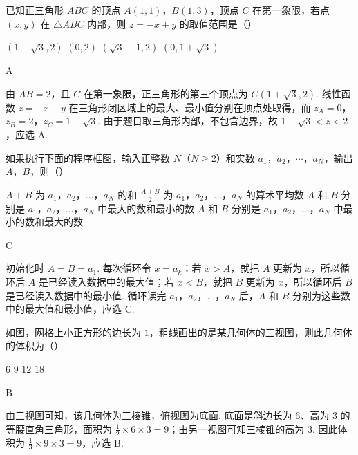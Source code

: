 \begin{problem}
已知正三角形 \(ABC\) 的顶点 \(A(1,1)\)，\(B(1,3)\)，顶点 \(C\) 在第一象限，若点 \((x,y)\) 在 \(\triangle ABC\) 内部，则 \(z = -x + y\) 的取值范围是（\quad）

\choices
    {\( (1-\sqrt{3},2) \)}
    {\((0,2)\)}
    {\((\sqrt{3} - 1, 2)\)}
    {\((0, 1 + \sqrt{3})\)}

\begin{answer}
A
\end{answer}

\begin{solution}
由 \(AB=2\)，且 \(C\) 在第一象限，正三角形的第三个顶点为 \(C(1+\sqrt3,2)\). 线性函数 \(z=-x+y\) 在三角形闭区域上的最大、最小值分别在顶点处取得，而
\(z_A=0\)，\(z_B=2\)，\(z_C=1-\sqrt3\). 由于题目取三角形内部，不包含边界，故 \(1-\sqrt3<z<2\)，应选 A.
\end{solution}
\end{problem}

\begin{problem}
如果执行下面的程序框图，输入正整数 \(N\)（\(N \geqslant 2\)）和实数 \(a_{1}\)，\(a_{2}\)，\(\cdots\)，\(a_{N}\)，输出 \(A\)，\(B\)，则（\quad）


\choices
    {\(A+B\) 为 \(a_1\)，\(a_2\)，\(\dots\)，\(a_N\) 的和}
    {\(\frac{A+B}{2}\) 为 \(a_1\)，\(a_2\)，\(\dots\)，\(a_N\) 的算术平均数}
    {\(A\) 和 \(B\) 分别是 \(a_1\)，\(a_2\)，\(\dots\)，\(a_N\) 中最大的数和最小的数}
    {\(A\) 和 \(B\) 分别是 \(a_1\)，\(a_2\)，\(\dots\)，\(a_N\) 中最小的数和最大的数}

\begin{answer}
C
\end{answer}

\begin{solution}
初始化时 \(A=B=a_1\). 每次循环令 \(x=a_k\)：若 \(x>A\)，就把 \(A\) 更新为 \(x\)，所以循环后 \(A\) 是已经读入数据中的最大值；若 \(x<B\)，就把 \(B\) 更新为 \(x\)，所以循环后 \(B\) 是已经读入数据中的最小值. 循环读完 \(a_1\)，\(a_2\)，\(\ldots\)，\(a_N\) 后，\(A\) 和 \(B\) 分别为这些数中的最大值和最小值，应选 C.
\end{solution}
\end{problem}

\begin{problem}
如图，网格上小正方形的边长为 \(1\)，粗线画出的是某几何体的三视图，则此几何体的体积为（\quad）


\choices
    {\(6\)}
    {\(9\)}
    {\(12\)}
    {\(18\)}

\begin{answer}
B
\end{answer}

\begin{solution}
由三视图可知，该几何体为三棱锥，俯视图为底面. 底面是斜边长为 \(6\)、高为 \(3\) 的等腰直角三角形，面积为 \(\frac12\times6\times3=9\)；由另一视图可知三棱锥的高为 \(3\). 因此体积为 \(\frac13\times9\times3=9\)，应选 B.
\end{solution}
\end{problem}


